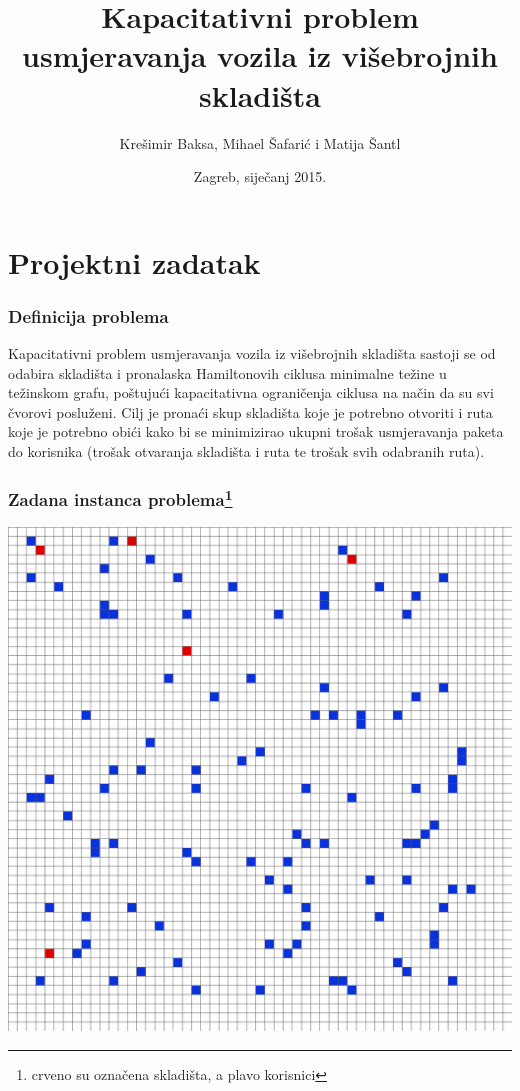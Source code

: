 \documentclass[utf8]{beamer}
\title[Projekt]{Kapacitativni problem usmjeravanja vozila iz višebrojnih skladišta}
\author{Krešimir Baksa, Mihael Šafarić i Matija Šantl}
\institute{Heurističke metode optimizacije\\*Fakultet elektrotehnike i računarstva}
\date{Zagreb, siječanj 2015.}
\begin{document}
\begin{frame}
\titlepage
\end{frame}

\section{Projektni zadatak}
\begin{frame}
\frametitle{Definicija problema}
Kapacitativni problem usmjeravanja vozila iz višebrojnih skladišta sastoji se od odabira skladišta i pronalaska Hamiltonovih ciklusa minimalne težine u težinskom grafu, poštujući kapacitativna ograničenja ciklusa na način da su svi čvorovi posluženi. Cilj je pronaći skup skladišta koje je potrebno otvoriti i ruta koje je potrebno obići kako bi se minimizirao ukupni trošak usmjeravanja paketa do korisnika (trošak otvaranja skladišta i ruta te trošak svih odabranih ruta).
\end{frame}

\begin{frame}
\frametitle{Zadana instanca problema\footnote{crveno su označena skladišta, a plavo korisnici}}
\begin{center} 
  \includegraphics[height=0.8\textheight]{media/hmp-grid.png} 
\end{center} 
\end{frame}
\end{document}
